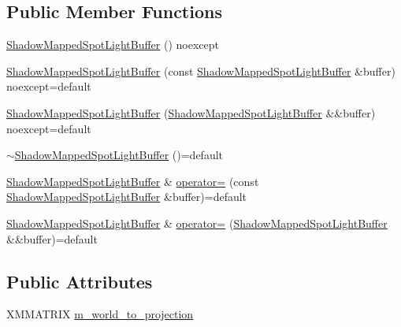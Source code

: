 \subsection*{Public Member Functions}
\begin{DoxyCompactItemize}
\item 
\mbox{\hyperlink{structmage_1_1rendering_1_1_shadow_mapped_spot_light_buffer_a88d393bc59e25f35d29e478de8c81c89}{Shadow\+Mapped\+Spot\+Light\+Buffer}} () noexcept
\item 
\mbox{\hyperlink{structmage_1_1rendering_1_1_shadow_mapped_spot_light_buffer_ac984180fa57278b851bbaf3b081a4343}{Shadow\+Mapped\+Spot\+Light\+Buffer}} (const \mbox{\hyperlink{structmage_1_1rendering_1_1_shadow_mapped_spot_light_buffer}{Shadow\+Mapped\+Spot\+Light\+Buffer}} \&buffer) noexcept=default
\item 
\mbox{\hyperlink{structmage_1_1rendering_1_1_shadow_mapped_spot_light_buffer_a9042ab916ee834f5519b5930de286ea4}{Shadow\+Mapped\+Spot\+Light\+Buffer}} (\mbox{\hyperlink{structmage_1_1rendering_1_1_shadow_mapped_spot_light_buffer}{Shadow\+Mapped\+Spot\+Light\+Buffer}} \&\&buffer) noexcept=default
\item 
\mbox{\hyperlink{structmage_1_1rendering_1_1_shadow_mapped_spot_light_buffer_ae651274fb4d113e173b62cb18191f1b9}{$\sim$\+Shadow\+Mapped\+Spot\+Light\+Buffer}} ()=default
\item 
\mbox{\hyperlink{structmage_1_1rendering_1_1_shadow_mapped_spot_light_buffer}{Shadow\+Mapped\+Spot\+Light\+Buffer}} \& \mbox{\hyperlink{structmage_1_1rendering_1_1_shadow_mapped_spot_light_buffer_a2c209b2648740696d45113a152e648fb}{operator=}} (const \mbox{\hyperlink{structmage_1_1rendering_1_1_shadow_mapped_spot_light_buffer}{Shadow\+Mapped\+Spot\+Light\+Buffer}} \&buffer)=default
\item 
\mbox{\hyperlink{structmage_1_1rendering_1_1_shadow_mapped_spot_light_buffer}{Shadow\+Mapped\+Spot\+Light\+Buffer}} \& \mbox{\hyperlink{structmage_1_1rendering_1_1_shadow_mapped_spot_light_buffer_ae2687b41af138b43fc814883310a877b}{operator=}} (\mbox{\hyperlink{structmage_1_1rendering_1_1_shadow_mapped_spot_light_buffer}{Shadow\+Mapped\+Spot\+Light\+Buffer}} \&\&buffer)=default
\end{DoxyCompactItemize}
\subsection*{Public Attributes}
\begin{DoxyCompactItemize}
\item 
X\+M\+M\+A\+T\+R\+IX \mbox{\hyperlink{structmage_1_1rendering_1_1_shadow_mapped_spot_light_buffer_abb736c590c4a6efff217e15ef8abec4a}{m\+\_\+world\+\_\+to\+\_\+projection}}
\end{DoxyCompactItemize}



